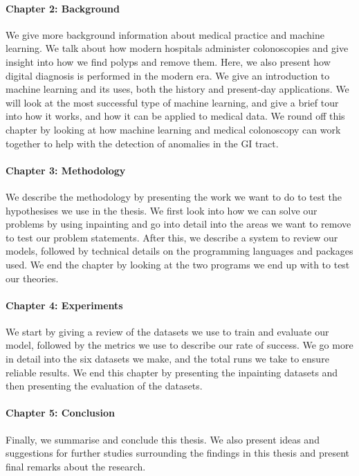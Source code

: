 \paragraph{Chapter 2: Background}
We give more background information about medical practice and machine learning.
We talk about how modern hospitals administer colonoscopies and give insight into how we find polyps and remove them. Here, we also present how digital diagnosis is performed in the modern era.  
We give an introduction to machine learning and its uses, both the history and present-day applications. We will look at the most successful type of machine learning, and give a brief tour into how it works, and how it can be applied to medical data.
We round off this chapter by looking at how machine learning and medical colonoscopy can work together to help with the detection of anomalies in the GI tract.

\paragraph{Chapter 3: Methodology }
We describe the methodology by presenting the work we want to do to test the hypothesises we use in the thesis.
We first look into how we can solve our problems by using inpainting and go into detail into the areas we want to remove to test our problem statements. 
After this, we describe a system to review our models, followed by technical details on the programming languages and packages used.
We end the chapter by looking at the two programs we end up with to test our theories. 


\paragraph{Chapter 4: Experiments}
We start by giving a review of the datasets we use to train and evaluate our model, followed by the metrics we use to describe our rate of success.
We go more in detail into the six datasets we make, and the  total runs we take to ensure reliable results.
We end this chapter by presenting the inpainting datasets and then presenting the evaluation of the datasets.


\paragraph{Chapter 5: Conclusion}
Finally, we summarise and conclude this thesis.
We also present ideas and suggestions for further studies surrounding
the findings in this thesis and present final remarks about the research.

